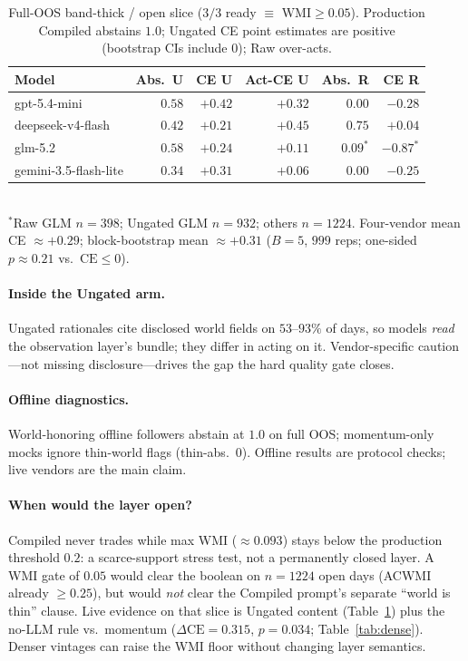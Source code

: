 \documentclass[sigconf,anonymous]{acmart}
\theoremstyle{acmdefinition}%
\theoremstyle{acmplain}%
\begin{document}
\begin{table}[t]
  \caption{Full-OOS band-thick / open slice ($3/3$ ready $\equiv$ $\mathrm{WMI}\ge 0.05$). Production Compiled abstains $1.0$; Ungated CE point estimates are positive (bootstrap CIs include 0); Raw over-acts.}
  \label{tab:thick}
  \small
  \begin{tabular}{lrrrrr}
    \toprule
    Model & Abs.\ U & CE U & Act-CE U & Abs.\ R & CE R \\
    \midrule
    gpt-5.4-mini & $0.58$ & $+0.42$ & $+0.32$ & $0.00$ & $-0.28$ \\
    deepseek-v4-flash & $0.42$ & $+0.21$ & $+0.45$ & $0.75$ & $+0.04$ \\
    glm-5.2 & $0.58$ & $+0.24$ & $+0.11$ & $0.09^*$ & $-0.87^*$ \\
    gemini-3.5-flash-lite & $0.34$ & $+0.31$ & $+0.06$ & $0.00$ & $-0.25$ \\
    \bottomrule
  \end{tabular}\\[-2pt]
  {\scriptsize $^*$Raw GLM $n{=}398$; Ungated GLM $n{=}932$; others $n{=}1224$. Four-vendor mean CE ${\approx}{+}0.29$; block-bootstrap mean ${\approx}{+}0.31$ ($B{=}5$, $999$ reps; one-sided $p{\approx}0.21$ vs.\ $\mathrm{CE}\le 0$).}
\end{table}

\paragraph{Inside the Ungated arm.}
Ungated rationales cite disclosed world fields on \(53\)--\(93\%\) of days, so models \emph{read} the observation layer's bundle; they differ in acting on it. Vendor-specific caution---not missing disclosure---drives the gap the hard quality gate closes.

\paragraph{Offline diagnostics.}
World-honoring offline followers abstain at \(1.0\) on full OOS; momentum-only mocks ignore thin-world flags (thin-abs.\ \(0\)). Offline results are protocol checks; live vendors are the main claim.

\paragraph{When would the layer open?}
Compiled never trades while max WMI (\({\approx}0.093\)) stays below the production threshold \(0.2\): a scarce-support stress test, not a permanently closed layer.
A WMI gate of \(0.05\) would clear the boolean on \(n{=}1224\) open days (ACWMI already \(\ge 0.25\)), but would \emph{not} clear the Compiled prompt's separate ``world is thin'' clause.
Live evidence on that slice is Ungated content (Table~\ref{tab:thick}) plus the no-LLM rule vs.\ momentum (\(\Delta\mathrm{CE}{=}0.315\), \(p{=}0.034\); Table~\ref{tab:dense}).
Denser vintages can raise the WMI floor without changing layer semantics.
\end{document}
